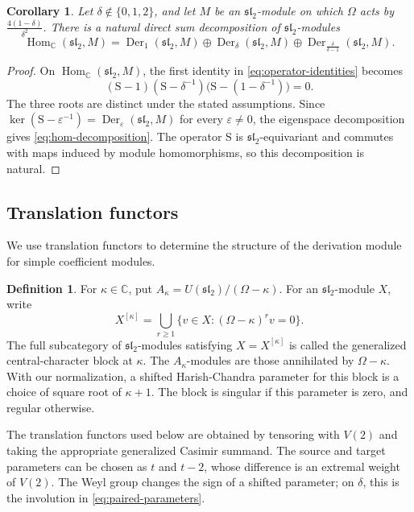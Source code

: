\documentclass[11pt,reqno]{amsart}
\numberwithin{equation}{section}
\newcommand{\C}{\mathbb C}
\newcommand{\s}{\mathfrak{sl}_2}
\DeclareMathOperator{\Der}{Der}
\DeclareMathOperator{\Hom}{Hom}
\newtheorem{corollary}[theorem]{Corollary}
\theoremstyle{definition}
\newtheorem{definition}[theorem]{Definition}
\theoremstyle{remark}
\begin{document}
\begin{corollary}\label{cor:hom-decomposition}
Let \(\delta\notin\{0,1,2\}\), and let \(M\) be an \(\s\)-module
on which \(\Omega\) acts by \(\frac{4(1-\delta)}{\delta^2}\).
There is a natural direct sum decomposition of \(\s\)-modules
\begin{equation}\label{eq:hom-decomposition}
\Hom_\C(\s,M)
=\Der_1(\s,M)\oplus\Der_\delta(\s,M)
\oplus\Der_{\frac{\delta}{\delta-1}}(\s,M).
\end{equation}
\end{corollary}
\begin{proof}
On \(\Hom_\C(\s,M)\), the first identity in
\eqref{eq:operator-identities} becomes
\[
(\mathrm{S}-1)(\mathrm{S}-\delta^{-1})
\bigl(\mathrm{S}-(1-\delta^{-1})\bigr)=0.
\]
The three roots are distinct under the stated assumptions.
Since \(\ker(\mathrm{S}-\varepsilon^{-1})=\Der_\varepsilon(\s,M)\)
for every \(\varepsilon\ne0\), the eigenspace decomposition gives
\eqref{eq:hom-decomposition}.
The operator \(\mathrm{S}\) is \(\s\)-equivariant and commutes with
maps induced by module homomorphisms, so this
decomposition is natural.
\end{proof}

\subsection{Translation functors}\label{sec:translation}

We use translation functors to determine the structure of the derivation
module for simple coefficient modules.

\begin{definition}\label{def:central-character}
For \(\kappa\in\C\), put \(A_\kappa=U(\s)/(\Omega-\kappa)\).
For an \(\s\)-module \(X\), write
\[
X^{[\kappa]}=\bigcup_{r\ge1}
\{v\in X:(\Omega-\kappa)^r v=0\}.
\]
The full subcategory of \(\s\)-modules satisfying \(X=X^{[\kappa]}\)
is called the generalized central-character block at \(\kappa\).
The \(A_\kappa\)-modules are those annihilated by \(\Omega-\kappa\).
With our normalization, a shifted Harish-Chandra parameter for this
block is a choice of square root of \(\kappa+1\).
The block is singular if this parameter is zero, and regular otherwise.
\end{definition}

The translation functors used below are obtained by tensoring
with \(V(2)\) and taking the appropriate generalized Casimir
summand. The source and target parameters can be chosen as
\(t\) and \(t-2\), whose difference is an extremal weight of \(V(2)\).
The Weyl group changes the sign of a shifted parameter;
on \(\delta\), this is the involution in
\eqref{eq:paired-parameters}.
\end{document}
